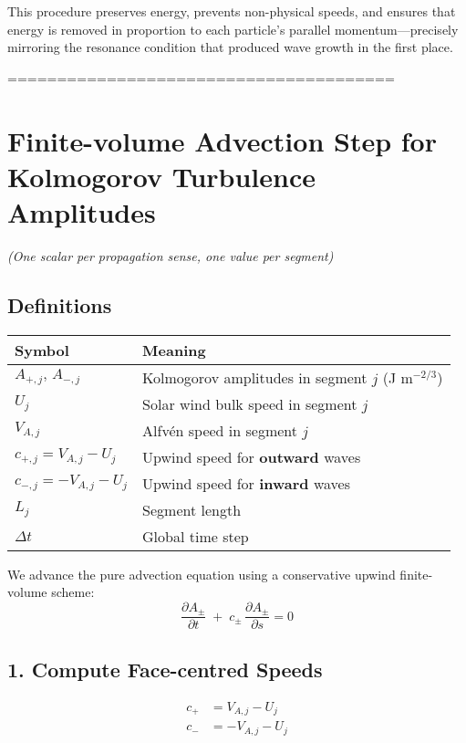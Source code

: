 \bigskip

\noindent
This procedure preserves energy, prevents non-physical speeds, and ensures that energy is removed in proportion to each particle’s parallel momentum—precisely mirroring the resonance condition that produced wave growth in the first place.


=======================================

\section*{Finite-volume Advection Step for Kolmogorov Turbulence Amplitudes}

\noindent
\emph{(One scalar per propagation sense, one value per segment)}

\subsection*{Definitions}

\begin{center}
\renewcommand{\arraystretch}{1.3}
\begin{tabular}{@{}ll@{}}
\toprule
\textbf{Symbol} & \textbf{Meaning} \\
\midrule
$A_{+,j},\,A_{-,j}$ & Kolmogorov amplitudes in segment $j$ (J m$^{-2/3}$) \\
$U_j$ & Solar wind bulk speed in segment $j$ \\
$V_{A,j}$ & Alfvén speed in segment $j$ \\
$c_{+,j} = V_{A,j} - U_j$ & Upwind speed for \textbf{outward} waves \\
$c_{-,j} = -V_{A,j} - U_j$ & Upwind speed for \textbf{inward} waves \\
$L_j$ & Segment length \\
$\Delta t$ & Global time step \\
\bottomrule
\end{tabular}
\end{center}

\medskip

We advance the pure advection equation using a conservative upwind finite-volume scheme:
\begin{equation}
\frac{\partial A_\pm}{\partial t}
\;+\;
c_\pm\,\frac{\partial A_\pm}{\partial s} = 0
\end{equation}

\subsection*{1. Compute Face-centred Speeds}
\begin{align*}
c_+ &= V_{A,j} - U_j \\
c_- &= -V_{A,j} - U_j
\end{align*}

